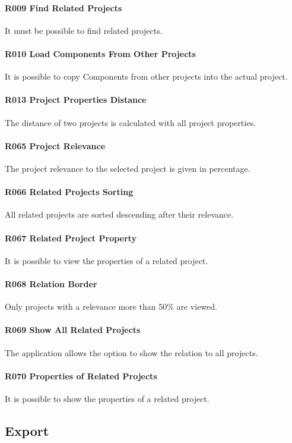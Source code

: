 \paragraph{R009 Find Related Projects}
It must be possible to find related projects.
\paragraph{R010 Load Components From Other Projects}
It is possible to copy Components from other projects into the actual project.
\paragraph{R013 Project Properties Distance}
The distance of two projects is calculated with all project properties.
\paragraph{R065 Project Relevance}
The project relevance to the selected project is given in percentage.
\paragraph{R066 Related Projects Sorting}
All related projects are sorted descending after their relevance.
\paragraph{R067 Related Project Property}
It is possible to view the properties of a related project.
\paragraph{R068 Relation Border}
Only projects with a relevance more than 50\% are viewed.
\paragraph{R069 Show All Related Projects}
The application allows the option to show the relation to all projects.
\paragraph{R070 Properties of Related Projects}
It is possible to show the properties of a related project.

\subsection{Export}
